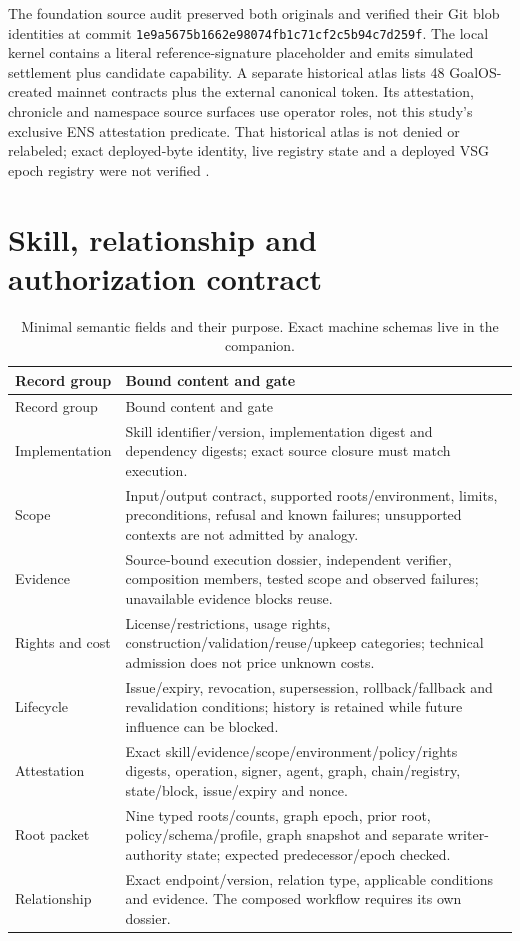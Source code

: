 \documentclass[11pt,a4paper]{article}
\newcommand{\code}[1]{\nolinkurl{#1}}
\begin{document}
The foundation source audit preserved both originals and verified their Git blob identities at commit \code{1e9a5675b1662e98074fb1c71cf2c5b94c7d259f}. The local kernel contains a literal reference-signature placeholder and emits simulated settlement plus candidate capability. A separate historical atlas lists 48 GoalOS-created mainnet contracts plus the external canonical token. Its attestation, chronicle and namespace source surfaces use operator roles, not this study's exclusive ENS attestation predicate. That historical atlas is not denied or relabeled; exact deployed-byte identity, live registry state and a deployed VSG epoch registry were not verified \citep{foundationsrepo,ascension}.

\clearpage
\section{Skill, relationship and authorization contract}
\label{app:schema}
\begin{longtable}{L{32mm}L{117mm}}
\caption{Minimal semantic fields and their purpose. Exact machine schemas live in the companion.}\\
\toprule Record group & Bound content and gate \\
\midrule\endfirsthead
\toprule Record group & Bound content and gate \\
\midrule\endhead
Implementation & Skill identifier/version, implementation digest and dependency digests; exact source closure must match execution. \\
Scope & Input/output contract, supported roots/environment, limits, preconditions, refusal and known failures; unsupported contexts are not admitted by analogy. \\
Evidence & Source-bound execution dossier, independent verifier, composition members, tested scope and observed failures; unavailable evidence blocks reuse. \\
Rights and cost & License/restrictions, usage rights, construction/validation/reuse/upkeep categories; technical admission does not price unknown costs. \\
Lifecycle & Issue/expiry, revocation, supersession, rollback/fallback and revalidation conditions; history is retained while future influence can be blocked. \\
Attestation & Exact skill/evidence/scope/environment/policy/rights digests, operation, signer, agent, graph, chain/registry, state/block, issue/expiry and nonce. \\
Root packet & Nine typed roots/counts, graph epoch, prior root, policy/schema/profile, graph snapshot and separate writer-authority state; expected predecessor/epoch checked. \\
Relationship & Exact endpoint/version, relation type, applicable conditions and evidence. The composed workflow requires its own dossier. \\
\bottomrule
\end{longtable}
\end{document}

